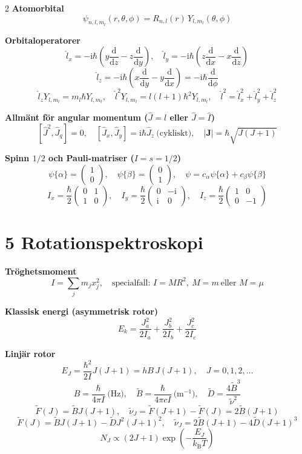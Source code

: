 \documentclass[10pt,a4paper]{article}
\newcommand{\dd}{\mathrm{d}}
\newcommand{\ii}{\mathrm{i}}
\newcommand{\kb}{k_{\mathrm B}}
\begin{document}
\begin{multicols*}{2}
\textbf{Atomorbital}
\[
\psi_{n,l,m_l}(r,\theta,\phi)=R_{n,l}(r)\,Y_{l,m_l}(\theta,\phi)
\]

\textbf{Orbitaloperatorer}
\[
\hat l_x=-\ii\hbar\left(y\frac{\dd}{\dd z}-z\frac{\dd}{\dd y}\right),\quad
\hat l_y=-\ii\hbar\left(z\frac{\dd}{\dd x}-x\frac{\dd}{\dd z}\right)
\]\[
\hat l_z=-\ii\hbar\left(x\frac{\dd}{\dd y}-y\frac{\dd}{\dd x}\right)=-\ii\hbar\frac{\dd}{\dd\phi}
\]
\[
\hat l_zY_{l,m_l}=m_l\hbar Y_{l,m_l},\quad \hat l^2Y_{l,m_l}=l(l+1)\hbar^2Y_{l,m_l},\quad \hat l^2=\hat l_x^2+\hat l_y^2+\hat l_z^2
\]

\textbf{Allm\"ant f\"or angular momentum ($\hat J=\hat l$ eller $\hat J=\hat I$)}
\[
[\hat J^2,\hat J_q]=0,\quad [\hat J_x,\hat J_y]=\ii\hbar\hat J_z\ \text{(cykliskt)},\quad |\mathbf J|=\hbar\sqrt{J(J+1)}
\]

\textbf{Spinn $1/2$ och Pauli-matriser ($I=s=1/2$)}
\[
\psi\{\alpha\}=\begin{pmatrix}1\\0\end{pmatrix},\quad
\psi\{\beta\}=\begin{pmatrix}0\\1\end{pmatrix},\quad
\psi=c_\alpha\psi\{\alpha\}+c_\beta\psi\{\beta\}
\]
\[
I_x=\frac{\hbar}{2}\begin{pmatrix}0&1\\1&0\end{pmatrix},\quad
I_y=\frac{\hbar}{2}\begin{pmatrix}0&-\ii\\ \ii&0\end{pmatrix},\quad
I_z=\frac{\hbar}{2}\begin{pmatrix}1&0\\0&-1\end{pmatrix}
\]

\section*{5 Rotationspektroskopi}

\textbf{Tr\"oghetsmoment}
\[
I=\sum_j m_j x_j^2,\quad \text{specialfall: } I=MR^2,\ M=m\ \text{eller }M=\mu
\]

\textbf{Klassisk energi (asymmetrisk rotor)}
\[
E_k=\frac{J_a^2}{2I_a}+\frac{J_b^2}{2I_b}+\frac{J_c^2}{2I_c}
\]

\textbf{Linj\"ar rotor}
\[
E_J=\frac{\hbar^2}{2I}J(J+1)=hB\,J(J+1),\quad J=0,1,2,\dots
\]
\[
B=\frac{\hbar}{4\pi I}\ \text{(Hz)},\quad \tilde B=\frac{\hbar}{4\pi c I}\ \text{(m$^{-1}$)},\quad\tilde D=\frac{4\tilde B^3}{\tilde\nu^2}
\]
\[
\tilde F(J)=\tilde B J(J+1),\quad \tilde\nu_J=\tilde F(J+1)-\tilde F(J)=2\tilde B(J+1)
\]
\[
\tilde F(J)=\tilde B J(J+1)-\tilde D J^2(J+1)^2,\quad
\tilde\nu_J=2\tilde B(J+1)-4\tilde D(J+1)^3
\]
\[
N_J\propto (2J+1)\exp\!\left(-\frac{E_J}{\kb T}\right)
\]


\end{multicols*}
\end{document}
